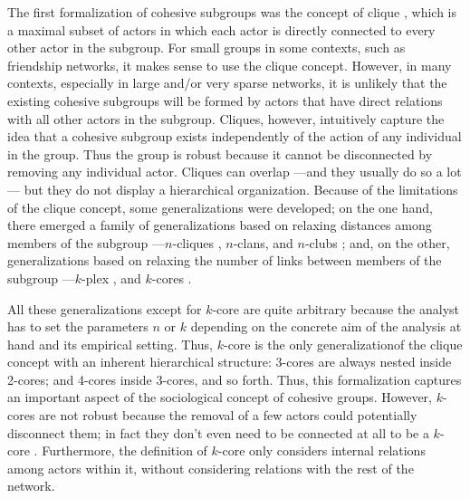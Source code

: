 The first formalization of cohesive subgroups was the concept of clique \citep{luce:1949}, which is a maximal subset of actors in which each actor is directly connected to every other actor in the subgroup. For small groups in some contexts, such as friendship networks, it makes sense to use the clique concept. However, in many contexts, especially in large and/or very sparse networks, it is unlikely that the existing cohesive subgroups will be formed by actors that have direct relations with all other actors in the subgroup. Cliques, however, intuitively capture the idea that a cohesive subgroup exists independently of the action of any individual in the group. Thus the group is robust because it cannot be disconnected by removing any individual actor. Cliques can overlap ---and they usually do so a lot--- but they do not display a hierarchical organization. Because of the limitations of the clique concept, some generalizations were developed; on the one hand, there emerged a family of generalizations based on relaxing distances among members of the subgroup ---$n$-cliques , $n$-clans, and $n$-clubs \citep{mokken:1979}; and, on the other, generalizations based on relaxing the number of links between members of the subgroup ---$k$-plex \citep{seidman:1978}, and $k$-cores \citep{seidman:1983}.

All these generalizations except for $k$-core are quite arbitrary because the analyst has to set the parameters $n$ or $k$ depending on the concrete aim of the analysis at hand and its empirical setting. Thus, $k$-core is the only generalizationof the clique concept with an inherent hierarchical structure: 3-cores are always nested inside 2-cores; and 4-cores inside 3-cores, and so forth. Thus, this formalization captures an important aspect of the sociological concept of cohesive groups. However, $k$-cores are not robust because the removal of a few actors could potentially disconnect them; in fact they don't even need to be connected at all to be a $k$-core \citep{white:2001}. Furthermore, the definition of $k$-core only considers internal relations among actors within it, without considering relations with the rest of the network.

